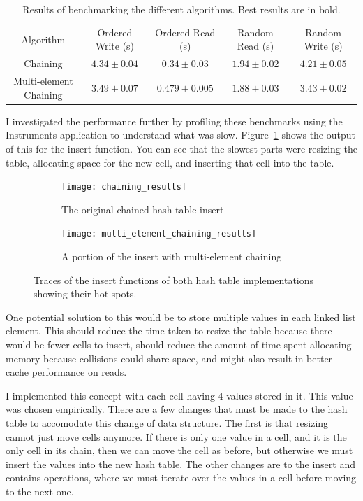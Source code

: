 \documentclass[12pt]{article}
\begin{document}
\begin{table}
    \begin{tabular}{ccccc} \toprule
        Algorithm & Ordered Write (s) & Ordered Read (s) & Random Read (s) & Random Write (s) \\
        Chaining & $4.34 \pm 0.04$ & $\mathbf{0.34 \pm 0.03}$ & $1.94 \pm 0.02$ & $4.21 \pm 0.05$ \\
        Multi-element Chaining & $\mathbf{3.49 \pm 0.07}$ & $0.479 \pm 0.005$ & $\mathbf{1.88 \pm 0.03}$ & $\mathbf{3.43 \pm 0.02}$ \\
        \bottomrule
    \end{tabular}
    \caption{Results of benchmarking the different algorithms. Best results are in bold.}\label{tab:perf}
\end{table}

I investigated the performance further by profiling these benchmarks using the Instruments application to 
understand what was slow. Figure~\ref{fig:chain_perf} shows the output of this for the insert function. You can see that the
slowest parts were resizing the table, allocating space for the new cell, and inserting that cell into the table. 

\begin{figure}
    \centering
    \begin{subfigure}{0.75\textwidth}
    \centering
    \texttt{[image: chaining\_results]}
    \caption{The original chained hash table insert}
    \label{fig:chain_perf}
\end{subfigure}
\begin{subfigure}{0.75\textwidth}
    \centering
    \texttt{[image: multi\_element\_chaining\_results]}
    \caption{A portion of the insert with multi-element chaining}\label{fig:mec_perf}
\end{subfigure}
\caption{Traces of the insert functions of both hash table implementations showing their hot spots.}
\end{figure}

One potential solution to this would be to store multiple values in each linked list element. This should reduce the 
time taken to resize the table because there would be fewer cells to insert, should reduce the amount of time spent
allocating memory because collisions could share space, and might also result in better cache performance on reads.

I implemented this concept with each cell having 4 values stored in it. This value was chosen empirically. There are a 
few changes that must be made to the hash table to accomodate this change of data structure. The first is that resizing
cannot just move cells anymore. If there is only one value in a cell, and it is the only cell in its chain, then we can
move the cell as before, but otherwise we must insert the values into the new hash table. The other changes are to the
insert and contains operations, where we must iterate over the values in a cell before moving to the next one.
\end{document}
